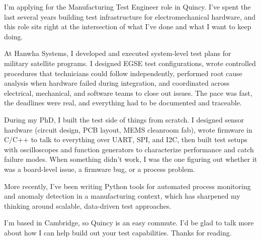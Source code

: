 \documentclass[letterpaper,11pt]{moderncv}
\date{\today}
\begin{document}
\makelettertitle

I'm applying for the Manufacturing Test Engineer role in Quincy. I've spent the last several years building test infrastructure for electromechanical hardware, and this role sits right at the intersection of what I've done and what I want to keep doing.

At Hanwha Systems, I developed and executed system-level test plans for military satellite programs. I designed EGSE test configurations, wrote controlled procedures that technicians could follow independently, performed root cause analysis when hardware failed during integration, and coordinated across electrical, mechanical, and software teams to close out issues. The pace was fast, the deadlines were real, and everything had to be documented and traceable.

During my PhD, I built the test side of things from scratch. I designed sensor hardware (circuit design, PCB layout, MEMS cleanroom fab), wrote firmware in C/C++ to talk to everything over UART, SPI, and I2C, then built test setups with oscilloscopes and function generators to characterize performance and catch failure modes. When something didn't work, I was the one figuring out whether it was a board-level issue, a firmware bug, or a process problem.

More recently, I've been writing Python tools for automated process monitoring and anomaly detection in a manufacturing context, which has sharpened my thinking around scalable, data-driven test approaches.

I'm based in Cambridge, so Quincy is an easy commute. I'd be glad to talk more about how I can help build out your test capabilities. Thanks for reading.

\makeletterclosing
\end{document}
